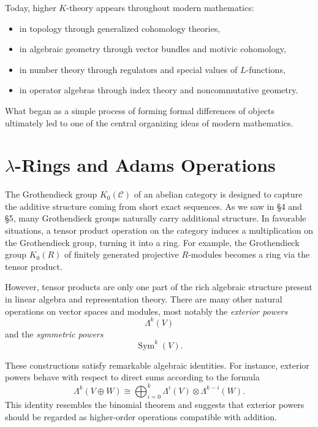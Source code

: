 \documentclass[12pt,reqno]{amsart}
\theoremstyle{plain}
\numberwithin{equation}{section}
\DeclareMathOperator{\Sym}{Sym}
\begin{document}
Today, higher $K$-theory appears throughout modern mathematics:
\begin{itemize}
    \item in topology through generalized cohomology theories,
    \item in algebraic geometry through vector bundles and motivic cohomology,
    \item in number theory through regulators and special values of $L$-functions,
    \item in operator algebras through index theory and noncommutative geometry.
\end{itemize}

What began as a simple process of forming formal differences of objects ultimately led to one of the central organizing ideas of modern mathematics.


























\section{$\lambda$-Rings and Adams Operations}

The Grothendieck group $K_0(\mathcal C)$ of an abelian category is designed to capture the additive structure coming from short exact sequences. As we saw in \S 4 and \S 5, many Grothendieck groups naturally carry additional structure. In favorable situations, a tensor product operation on the category induces a multiplication on the Grothendieck group, turning it into a ring. For example, the Grothendieck group $K_0(R)$ of finitely generated projective $R$-modules becomes a ring via the tensor product.

However, tensor products are only one part of the rich algebraic structure present in linear algebra and representation theory. There are many other natural operations on vector spaces and modules, most notably the \emph{exterior powers}
\[
\Lambda^k(V)
\]
and the \emph{symmetric powers}
\[
\Sym^k(V).
\]

These constructions satisfy remarkable algebraic identities. For instance, exterior powers behave with respect to direct sums according to the formula
\begin{equation}\label{eq: exterior}
    \Lambda^k(V\oplus W)
\cong
\bigoplus_{i=0}^k
\Lambda^i(V)\otimes \Lambda^{k-i}(W).
\end{equation}
This identity resembles the binomial theorem and suggests that exterior powers should be regarded as higher-order operations compatible with addition.
\end{document}
